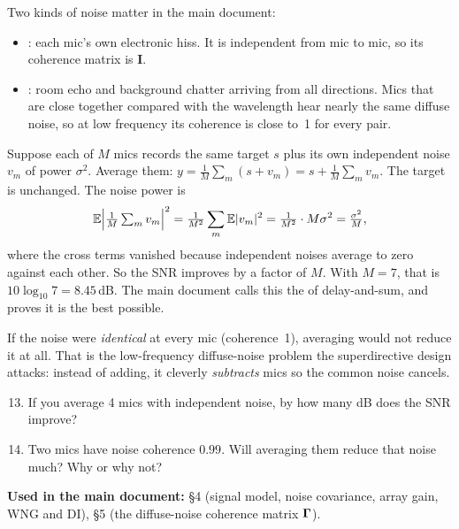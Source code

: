 \documentclass[11pt]{article}
\begin{document}
Two kinds of noise matter in the main document:
\begin{itemize}[nosep]
\item {}: each mic's own electronic hiss. It is independent from mic to
  mic, so its coherence matrix is $\mathbf I$.
\item {}: room echo and background chatter arriving from all
  directions. Mics that are close together compared with the wavelength hear nearly the same
  diffuse noise, so at low frequency its coherence is close to~1 for every pair.
\end{itemize}

\begin{example}\label{ex:avg}
Suppose each of $M$ mics records the same target $s$ plus its own independent noise $v_m$ of
power $\sigma^2$. Average them: $y=\frac1M\sum_m(s+v_m)=s+\frac1M\sum_m v_m$. The target is
unchanged. The noise power is
\[
  \mathbb{E}\Big|\tfrac1M\textstyle\sum_m v_m\Big|^2=\tfrac{1}{M^2}\displaystyle\sum_m\mathbb{E}|v_m|^2=\tfrac{1}{M^2}\cdot M\sigma^2=\tfrac{\sigma^2}{M},
\]
where the cross terms vanished because independent noises average to zero against each other.
So the SNR improves by a factor of $M$. With $M=7$, that is $10\log_{10}7=8.45$\,dB. The main
document calls this the  of delay-and-sum, and proves it is the best
possible.

If the noise were \emph{identical} at every mic (coherence~1), averaging would not reduce it at
all. That is the low-frequency diffuse-noise problem the superdirective design attacks: instead
of adding, it cleverly \emph{subtracts} mics so the common noise cancels.
\end{example}

\begin{checkyourself}
\begin{enumerate}[nosep]
\setcounter{enumi}{12}
\item If you average 4 mics with independent noise, by how many dB does the SNR improve?
\item Two mics have noise coherence $0.99$. Will averaging them reduce that noise much? Why or
  why not?
\end{enumerate}
\end{checkyourself}

\begin{whereused}
\textbf{Used in the main document:} \S4 (signal model, noise covariance, array gain, WNG and DI),
\S5 (the diffuse-noise coherence matrix $\bm{\Gamma}$).
\end{whereused}
\end{document}
